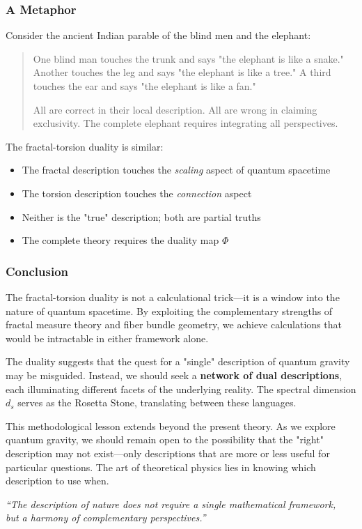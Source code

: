 \subsubsection{A Metaphor}

Consider the ancient Indian parable of the blind men and the elephant:

\begin{quote}
One blind man touches the trunk and says "the elephant is like a snake."  
Another touches the leg and says "the elephant is like a tree."  
A third touches the ear and says "the elephant is like a fan."

All are correct in their local description.  
All are wrong in claiming exclusivity.  
The complete elephant requires integrating all perspectives.
\end{quote}

The fractal-torsion duality is similar:
\begin{itemize}
    \item The fractal description touches the \textit{scaling} aspect of quantum spacetime
    \item The torsion description touches the \textit{connection} aspect
    \item Neither is the "true" description; both are partial truths
    \item The complete theory requires the duality map $\Phi$
\end{itemize}

\subsubsection{Conclusion}

The fractal-torsion duality is not a calculational trick—it is a window into the nature of quantum spacetime. By exploiting the complementary strengths of fractal measure theory and fiber bundle geometry, we achieve calculations that would be intractable in either framework alone.

The duality suggests that the quest for a "single" description of quantum gravity may be misguided. Instead, we should seek a \textbf{network of dual descriptions}, each illuminating different facets of the underlying reality. The spectral dimension $d_s$ serves as the Rosetta Stone, translating between these languages.

This methodological lesson extends beyond the present theory. As we explore quantum gravity, we should remain open to the possibility that the "right" description may not exist—only descriptions that are more or less useful for particular questions. The art of theoretical physics lies in knowing which description to use when.

\begin{flushright}
\textit{``The description of nature does not require a single mathematical framework,\\
but a harmony of complementary perspectives.''}
\end{flushright}
